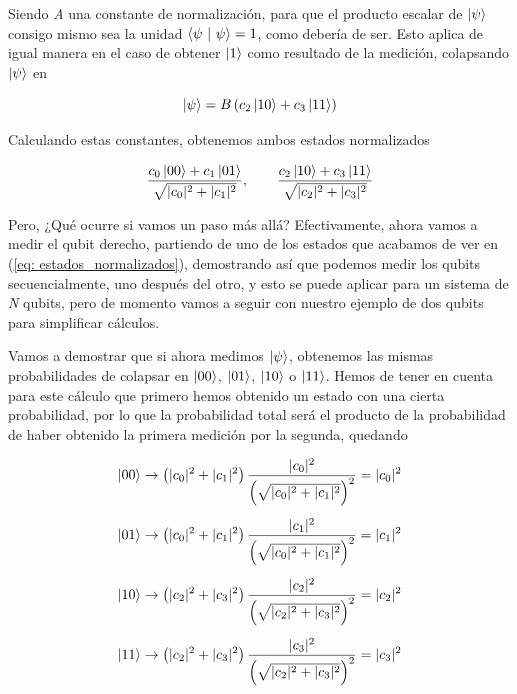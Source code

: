 \documentclass[12pt]{article}
\numberwithin{equation}{section} %
\begin{document}
    Siendo \textit{A} una constante de normalización, para que el producto escalar de \( \ket{\psi} \) consigo mismo sea la unidad \( \braket{\psi \ | \ \psi} = 1 \), como debería de ser. Esto aplica de igual manera en el caso de obtener \( \ket{1} \) como resultado de la medición, colapsando \( \ket{\psi} \) en 

    \begin{equation*}
        \ket{\psi} = B \left( c_{2} \ket{1 0} + c_{3} \ket{1 1} \right)
    \end{equation*}

    \vspace{2.5mm}

    Calculando estas constantes, obtenemos ambos estados normalizados

    \begin{equation}
        \frac{c_{0} \ket{0 0} + c_{1} \ket{0 1}}{\sqrt{| c_{0} |^{2} + | c_{1} |^{2}}}, \qquad \frac{c_{2} \ket{1 0} + c_{3} \ket{1 1}}{\sqrt{| c_{2} |^{2} + | c_{3} |^{2}}}
        \label{eq: estados_normalizados}
    \end{equation}

    \vspace{2.5mm}

    Pero, ¿Qué ocurre si vamos un paso más allá? Efectivamente, ahora vamos a medir el qubit derecho, partiendo de uno de los estados que acabamos de ver en (\ref{eq: estados_normalizados}), demostrando así que podemos medir los qubits secuencialmente, uno después del otro, y esto se puede aplicar para un sistema de \textit{N} qubits, pero de momento vamos a seguir con nuestro ejemplo de dos qubits para simplificar cálculos.

    \vspace{5mm}

    Vamos a demostrar que si ahora medimos \( \ket{\psi} \), obtenemos las mismas probabilidades de colapsar en \( \ket{0 0} \), \( \ket{0 1} \), \( \ket{1 0} \) o \( \ket{1 1} \). Hemos de tener en cuenta para este cálculo que primero hemos obtenido un estado con una cierta probabilidad, por lo que la probabilidad total será el producto de la probabilidad de haber obtenido la primera medición por la segunda, quedando

    \begin{align*}
        \ket{0 0} &\rightarrow \left(| c_{0} |^{2} + | c_{1} |^{2}\right) \frac{| c_{0} |^{2}}{\left( \sqrt{| c_{0} |^{2} + | c_{1} |^{2}} \right)^{2}} = | c_{0} |^{2} \\[5pt]
        \ket{0 1} &\rightarrow \left(| c_{0} |^{2} + | c_{1} |^{2}\right) \frac{| c_{1} |^{2}}{\left( \sqrt{| c_{0} |^{2} + | c_{1} |^{2}} \right)^{2}} = | c_{1} |^{2} \\[5pt]
        \ket{1 0} &\rightarrow \left(| c_{2} |^{2} + | c_{3} |^{2}\right) \frac{| c_{2} |^{2}}{\left( \sqrt{| c_{2} |^{2} + | c_{3} |^{2}} \right)^{2}} = | c_{2} |^{2} \\[5pt]
        \ket{1 1} &\rightarrow \left(| c_{2} |^{2} + | c_{3} |^{2}\right) \frac{| c_{3} |^{2}}{\left( \sqrt{| c_{2} |^{2} + | c_{3} |^{2}} \right)^{2}} = | c_{3} |^{2} \\[5pt]
    \end{align*}
\end{document}
